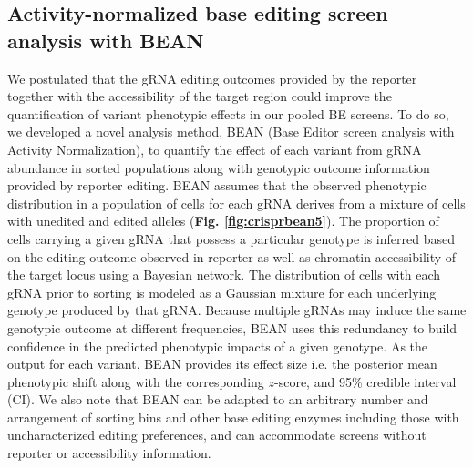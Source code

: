 \documentclass[a4paper, titlepage, openright]{book}
\begin{document}
\subsection{Activity-normalized base editing screen analysis with BEAN}
We postulated that the gRNA editing outcomes provided by the reporter together with the accessibility of the target region could improve the quantification of variant phenotypic effects in our pooled BE screens. To do so, we developed a novel analysis method, BEAN (Base Editor screen analysis with Activity Normalization), to quantify the effect of each variant from gRNA abundance in sorted populations along with genotypic outcome information provided by reporter editing. BEAN assumes that the observed phenotypic distribution in a population of cells for each gRNA derives from a mixture of cells with unedited and edited alleles (\textbf{Fig. \ref{fig:crisprbean5}}). The proportion of cells carrying a given gRNA that possess a particular genotype is inferred based on the editing outcome observed in reporter as well as chromatin accessibility of the target locus using a Bayesian network. The distribution of cells with each gRNA prior to sorting is modeled as a Gaussian mixture for each underlying genotype produced by that gRNA. Because multiple gRNAs may induce the same genotypic outcome at different frequencies, BEAN uses this redundancy to build confidence in the predicted phenotypic impacts of a given genotype. As the output for each variant, BEAN provides its effect size i.e. the posterior mean phenotypic shift along with the corresponding $z$-score, and 95\% credible interval (CI). We also note that BEAN can be adapted to an arbitrary number and arrangement of sorting bins and other base editing enzymes including those with uncharacterized editing preferences, and can accommodate screens without reporter or accessibility information. 
\end{document}
